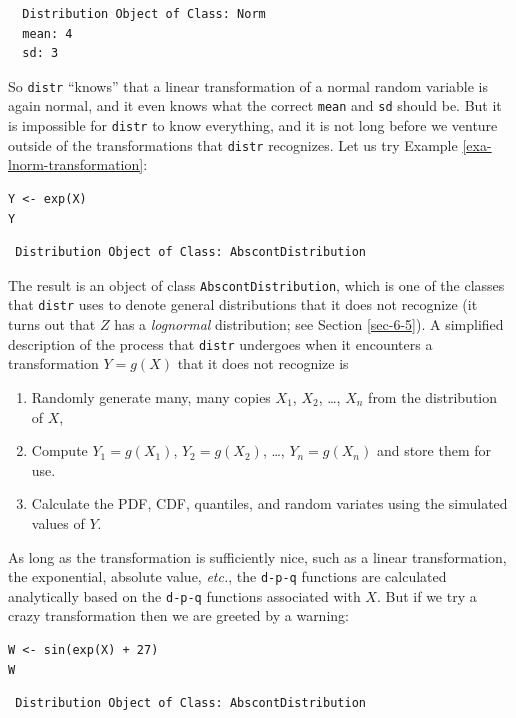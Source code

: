\documentclass[captions=tableheading]{scrbook}
\begin{document}
\begin{verbatim}
  Distribution Object of Class: Norm
  mean: 4
  sd: 3
\end{verbatim}

So \texttt{distr} ``knows'' that a linear transformation of a normal random variable is again normal, and it even knows what the correct \texttt{mean} and \texttt{sd} should be. But it is impossible for \texttt{distr} to know everything, and it is not long before we venture outside of the transformations that \texttt{distr} recognizes. Let us try Example \ref{exa-lnorm-transformation}:


\lstset{language=R}
\begin{lstlisting}
Y <- exp(X)
Y
\end{lstlisting}

\begin{verbatim}
 Distribution Object of Class: AbscontDistribution
\end{verbatim}

The result is an object of class \texttt{AbscontDistribution}, which is one of the classes that \texttt{distr} uses to denote general distributions that it does not recognize (it turns out that \(Z\) has a \emph{lognormal} distribution; see Section \ref{sec-6-5}). A simplified description of the process that \texttt{distr} undergoes when it encounters a transformation \(Y=g(X)\) that it does not recognize is
\begin{enumerate}
\item Randomly generate many, many copies \(X_{1}\), \(X_{2}\), \ldots{}, \(X_{n}\) from the distribution of \(X\),
\item Compute \(Y_{1}=g(X_{1})\), \(Y_{2}=g(X_{2})\), \ldots{}, \(Y_{n}=g(X_{n})\) and store them for use.
\item Calculate the PDF, CDF, quantiles, and random variates using the simulated values of \(Y\).
\end{enumerate}
As long as the transformation is sufficiently nice, such as a linear transformation, the exponential, absolute value, \emph{etc.}, the \texttt{d-p-q} functions are calculated analytically based on the \texttt{d-p-q} functions associated with \(X\). But if we try a crazy transformation then we are greeted by a warning:


\lstset{language=R}
\begin{lstlisting}
W <- sin(exp(X) + 27)
W
\end{lstlisting}

\begin{verbatim}
 Distribution Object of Class: AbscontDistribution
\end{verbatim}
\end{document}
